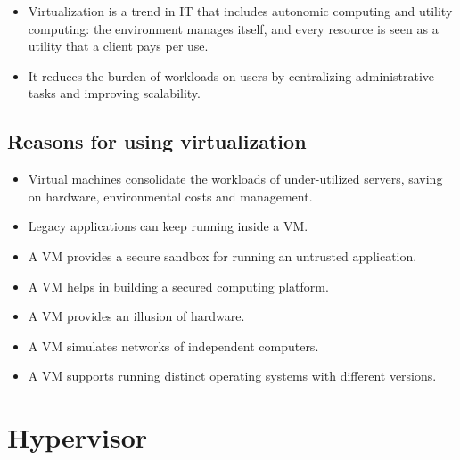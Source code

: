 \documentclass[11pt,a4paper]{article}
\begin{document}
\begin{itemize}\itemsep2pt
  \item Virtualization is a trend in IT that includes autonomic computing and utility
        computing: the environment manages itself, and every resource is seen as a utility
        that a client pays per use.
  \item It reduces the burden of workloads on users by centralizing administrative tasks and
        improving scalability.
\end{itemize}

\subsection{Reasons for using virtualization}

\begin{itemize}\itemsep3pt
  \item Virtual machines consolidate the workloads of under-utilized servers, saving on
        hardware, environmental costs and management.
  \item Legacy applications can keep running inside a VM.
  \item A VM provides a secure sandbox for running an untrusted application.
  \item A VM helps in building a secured computing platform.
  \item A VM provides an illusion of hardware.
  \item A VM simulates networks of independent computers.
  \item A VM supports running distinct operating systems with different versions.
\end{itemize}

\newpage
\section{Hypervisor}



\end{document}
